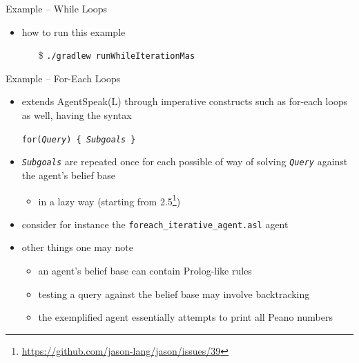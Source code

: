 \documentclass[presentation]{beamer}\mode<presentation>{\usetheme{AMSBolognaFC}}
\begin{document}
\begin{frame}[c, allowframebreaks]{Example \theJasonExample{} -- While Loops}
\begin{itemize}
        \vspace{.3cm}
        
        \item how to run this example
        \begin{itemize}
            \item[\$] \texttt{./gradlew run\alert{WhileIteration}Mas}
        \end{itemize}
        
    \end{itemize}
\end{frame}

\begin{frame}[c, allowframebreaks]{Example \theJasonExample{} -- For-Each Loops}
    \begin{itemize}
        \item \jason{} extends AgentSpeak(L) through imperative constructs such as \alert{for-each} loops as well, having the syntax
        \begin{center}
            \texttt{for(\textit{Query}) \{ \textit{Subgoals} \} }
        \end{center}
        
        \vspace{.3cm}
        
        \item \texttt{\textit{Subgoals}} are repeated once for each possible of way of solving \texttt{\textit{Query}} against the agent's belief base
        \begin{itemize}
            \item in a lazy way (starting from \jason{} 2.5\footnote{\url{https://github.com/jason-lang/jason/issues/39}})
        \end{itemize}
        
        \vspace{.3cm} 
        
        \item consider for instance the \texttt{foreach\_iterative\_agent.asl} agent
        
        
        \vspace{.3cm}
        
        \item other things one may note
        \begin{itemize}
            \item an agent's belief base can contain Prolog-like \alert{rules}
            \item testing a query against the belief base may involve \alert{backtracking} 
            \item the exemplified agent essentially attempts to print all \alert{Peano numbers}
        \end{itemize}
        

\end{itemize}
\end{frame}
\end{document}
